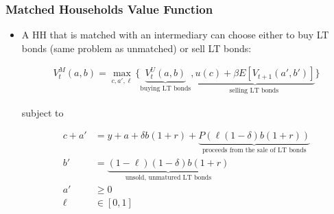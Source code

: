 \documentclass[handout]{beamer}
\begin{document}
\begin{frame}
\frametitle{Matched Households Value Function}

\begin{itemize}[<+->]

\item A HH that is matched with an intermediary can choose either to buy LT bonds (same problem as unmatched)  or sell LT bonds:

\begin{align*}
V_{t}^M(a, b) 
= \max_{c, a', \ell} 
\Bigg\{ 
\underbrace{ V_t^U(a, b)}_{\text{buying LT bonds}},\underbrace{  u(c) + \beta E[V_{t+1}(a', b')]}_{\text{selling LT bonds }} \Bigg\}
\end{align*}

subject to

\begin{align*}
c + a' &= y + a + \delta b (1 + r)+ \underbrace{P(\ell (1-\delta)b(1+r))}_{\text{proceeds from the sale of LT bonds}}\\ 
b' &= \underbrace{(1-\ell)(1-\delta)b(1+r)}_{\text{unsold, unmatured LT bonds}}\\
a' &\ge 0\\
\ell &\in [0, 1]
\end{align*}

\end{itemize}

\end{frame}
\end{document}

